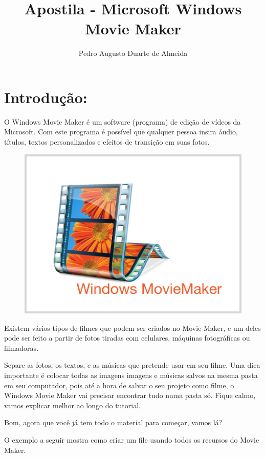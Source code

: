 \documentclass{article}
\title{Apostila - Microsoft Windows Movie Maker}
\author{Pedro Augusto Duarte de Almeida}
\date{}
\begin{document}
\maketitle

{\large

\section{Introdução:}
O Windows Movie Maker é um software (programa) de edição de vídeos da Microsoft.
Com este programa é possível que qualquer pessoa insira áudio, títulos, textos personalizados e efeitos de transição em suas fotos.

\begin{figure}[h!]
\centering
\includegraphics[scale=0.5]{movie-maker.png}
\end{figure} 

Existem vários tipos de filmes que podem ser criados no Movie Maker, e um deles pode ser feito a partir de fotos tiradas com celulares, máquinas fotográficas ou filmadoras.

Separe as fotos, os textos, e as músicas que pretende usar em seu filme. Uma dica importante é colocar todas as imagens imagens e músicas salvos na mesma pasta em seu computador, pois até a hora de salvar o seu projeto como filme, o Windows Movie Maker vai precisar encontrar tudo numa pasta só. Fique calmo, vamos explicar melhor ao longo do tutorial. \newline

Bom, agora que você já tem todo o material para começar, vamos lá? \newline

O exemplo a seguir mostra como criar um file usando todos os recursos do
Movie Maker. \newline

}
\end{document}
